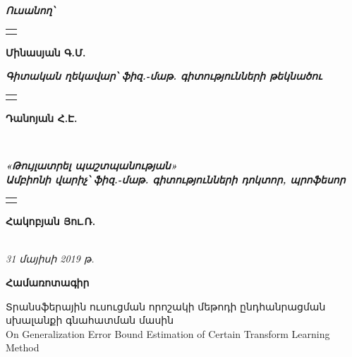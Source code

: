 \documentclass[12pt]{article}
\newcommand{\undertextline}[2]{ {
\renewcommand{\arraystretch}{0.7}
\begin{tabular}{p{#2cm}}
\\
\hline
\centering{{\fontsize{8pt}{8pt} \textit{#1}}}
\end{tabular}} }
\begin{document}
{


{\fontsize{13pt}{13pt} \selectfont \textit{\textbf{Ուսանող՝}}}
 \hspace{0.3cm} \undertextline{ստորագրություն}{7} \hspace{0.3cm}  {\fontsize{13pt}{13pt} \selectfont \textbf{Մինասյան Գ.Մ.}}\\
 
\vspace{5mm}

{\fontsize{13pt}{13pt} \selectfont \textit{\textbf{Գիտական ղեկավար՝  \hspace{0.3cm}ֆիզ.-մաթ. գիտությունների թեկնածու}}}\\


\large{\hspace{4cm} \undertextline{ստորագրություն}{7} \hspace{0.3cm} \hspace{0.3cm}  {\fontsize{13pt}{13pt} \selectfont \textbf{Դանոյան Հ.Է.}}}\\


\vspace{30mm}


{\fontsize{13pt}{13pt} \selectfont \textit{\textbf{«Թույլատրել պաշտպանության»}}}\\

{\fontsize{13pt}{13pt} \selectfont \textit{\textbf{Ամբիոնի վարիչ՝   \hspace{0.3cm}ֆիզ.-մաթ. գիտությունների դոկտոր, պրոֆեսոր}}}\\

\large{\hspace{3.5cm}  \undertextline{ստորագրություն}{7} \hspace{0.3cm} {\fontsize{13pt}{13pt} \selectfont \textbf{Հակոբյան Յու.Ռ.}}  } \\

{\fontsize{13pt}{13pt} \selectfont \textit{{31 մայիսի 2019 թ.}}}
}
\pagebreak






\begin{center}
\Large{\textbf{Համառոտագիր}}
 \end{center}
 \vspace{10mm}
{
\small Տրանսֆերային ուսուցման որոշակի մեթոդի ընդհանրացման սխալանքի գնահատման մասին\\
On Generalization Error Bound Estimation of Certain Transform Learning Method
}


\pagebreak
\end{document}
